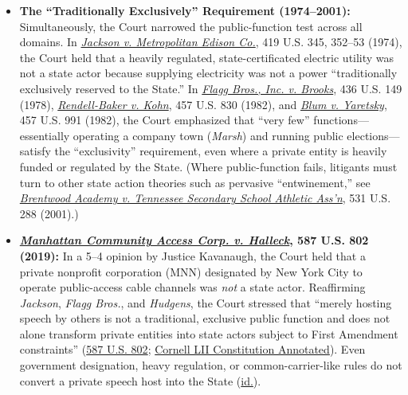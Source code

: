 \documentclass[12pt]{article}
\begin{document}
\begin{itemize}
\item \textbf{The ``Traditionally Exclusively'' Requirement (1974--2001):} Simultaneously, the Court narrowed the public-function test across all domains. In \href{https://supreme.justia.com/cases/federal/us/419/345/}{\textit{Jackson v. Metropolitan Edison Co.}}, 419 U.S. 345, 352--53 (1974), the Court held that a heavily regulated, state-certificated electric utility was not a state actor because supplying electricity was not a power ``traditionally exclusively reserved to the State.'' In \href{https://supreme.justia.com/cases/federal/us/436/149/}{\textit{Flagg Bros., Inc. v. Brooks}}, 436 U.S. 149 (1978), \href{https://supreme.justia.com/cases/federal/us/457/830/}{\textit{Rendell-Baker v. Kohn}}, 457 U.S. 830 (1982), and \href{https://supreme.justia.com/cases/federal/us/457/991/}{\textit{Blum v. Yaretsky}}, 457 U.S. 991 (1982), the Court emphasized that ``very few'' functions---essentially operating a company town (\textit{Marsh}) and running public elections---satisfy the ``exclusivity'' requirement, even where a private entity is heavily funded or regulated by the State. (Where public-function fails, litigants must turn to other state action theories such as pervasive ``entwinement,'' see \href{https://supreme.justia.com/cases/federal/us/531/288/}{\textit{Brentwood Academy v. Tennessee Secondary School Athletic Ass'n}}, 531 U.S. 288 (2001).)

\item \textbf{\href{https://supreme.justia.com/cases/federal/us/587/17-1702/}{\textit{Manhattan Community Access Corp. v. Halleck}}, 587 U.S. 802 (2019):} In a 5--4 opinion by Justice Kavanaugh, the Court held that a private nonprofit corporation (MNN) designated by New York City to operate public-access cable channels was \textit{not} a state actor. Reaffirming \textit{Jackson}, \textit{Flagg Bros.}, and \textit{Hudgens}, the Court stressed that ``merely hosting speech by others is not a traditional, exclusive public function and does not alone transform private entities into state actors subject to First Amendment constraints'' (\href{https://supreme.justia.com/cases/federal/us/587/17-1702/}{587 U.S. 802}; \href{https://www.law.cornell.edu/constitution-conan/amendment-1/state-action-doctrine-and-free-speech}{Cornell LII Constitution Annotated}). Even government designation, heavy regulation, or common-carrier-like rules do not convert a private speech host into the State (\href{https://supreme.justia.com/cases/federal/us/587/17-1702/}{id.}).

\end{itemize}
\end{document}
